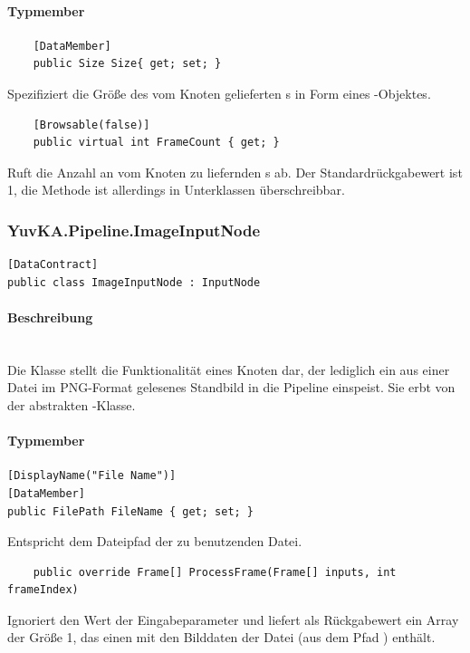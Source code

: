 \paragraph{Typmember}
\begin{itemize}

	\begin{verbatim}
	[DataMember]
	public Size Size{ get; set; }
	\end{verbatim}
	Spezifiziert die Größe des vom Knoten gelieferten s in Form eines -Objektes.

	\begin{verbatim}
	[Browsable(false)]
	public virtual int FrameCount { get; }
	\end{verbatim}
	Ruft die Anzahl an vom Knoten zu liefernden s ab. Der Standardrückgabewert ist 1, die Methode ist allerdings in Unterklassen überschreibbar.

\end{itemize}

\subsubsection{YuvKA.Pipeline.ImageInputNode}

\begin{verbatim}
[DataContract]
public class ImageInputNode : InputNode
\end{verbatim}

\paragraph{Beschreibung}~\\
Die Klasse  stellt die Funktionalität eines Knoten dar, der lediglich ein aus einer Datei im PNG-Format gelesenes Standbild in die Pipeline einspeist. Sie erbt von der abstrakten -Klasse.

\paragraph{Typmember}
\begin{itemize}

	\begin{verbatim}
[DisplayName("File Name")]
[DataMember]
public FilePath FileName { get; set; }
	\end{verbatim}
	Entspricht dem Dateipfad der zu benutzenden Datei.

	\begin{verbatim}
	public override Frame[] ProcessFrame(Frame[] inputs, int frameIndex)
	\end{verbatim}
	Ignoriert den Wert der Eingabeparameter und liefert als Rückgabewert ein Array der Größe 1, das einen  mit den Bilddaten der Datei (aus dem Pfad ) enthält.

\end{itemize}
